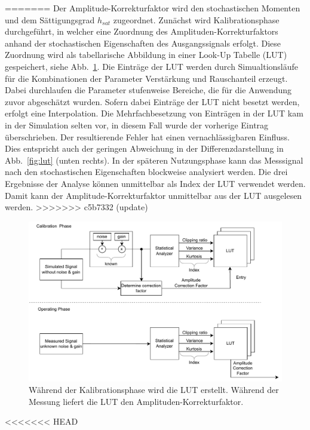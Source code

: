 =======
Der Amplitude-Korrekturfaktor wird den stochastischen Momenten und dem Sättigungsgrad $h_{sat}$ zugeordnet. Zunächst wird Kalibrationsphase durchgeführt, in welcher eine Zuordnung des Amplituden-Korrekturfaktors anhand der stochastischen Eigenschaften des Ausgangssignals erfolgt. Diese Zuordnung wird als tabellarische Abbildung in einer Look-Up Tabelle (LUT) gespeichert, siehe Abb.~\ref{fig:factor_eval}. 
Die Einträge der LUT werden durch Simualtionsläufe für die Kombinationen der Parameter Verstärkung und Rauschanteil erzeugt. Dabei durchlaufen die Parameter stufenweise Bereiche, die für die Anwendung zuvor abgeschätzt wurden. Sofern dabei Einträge der LUT nicht besetzt werden, erfolgt eine Interpolation. %
Die Mehrfachbesetzung von Einträgen in der LUT kam in der Simulation selten vor, in diesem Fall wurde der vorherige Eintrag überschrieben. Der resultierende Fehler hat einen vernachlässigbaren Einfluss. Dies entspricht auch der geringen Abweichung in der Differenzdarstellung in Abb.~\ref{fig:lut} (unten rechts). In der späteren Nutzungsphase kann das Messsignal nach den stochastischen Eigenschaften blockweise analysiert werden. Die drei Ergebnisse der Analyse können unmittelbar als Index der LUT verwendet werden. Damit kann der Amplitude-Korrekturfaktor unmittelbar aus der LUT ausgelesen werden.
>>>>>>> c5b7332 (update)
\begin{figure}[th!]
	\centering
	\includegraphics[width=.9\textwidth]{../img/factor.pdf}
	\caption{Während der Kalibrationsphase wird die LUT erstellt. Während der Messung liefert die LUT den Amplituden-Korrekturfaktor.}
	\label{fig:factor_eval} 
\end{figure}
<<<<<<< HEAD

